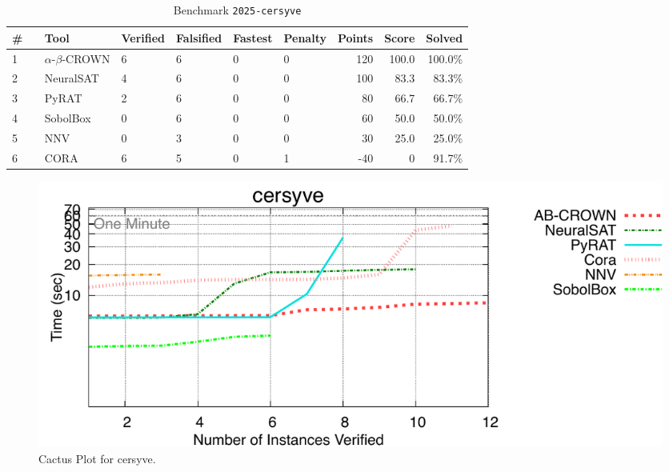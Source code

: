 \begin{table}[h]
\begin{center}
\caption{Benchmark \texttt{2025-cersyve}} \label{tab:cat_2025_cersyve}
{\setlength{\tabcolsep}{2pt}
\begin{tabular}[h]{@{}llllllrrr@{}}
\toprule
\textbf{\# ~} & \textbf{Tool} & \textbf{Verified} & \textbf{Falsified} & \textbf{Fastest} & \textbf{Penalty} & \textbf{Points} & \textbf{Score} & \textbf{Solved}\\
\midrule
1 & $\alpha$-$\beta$-CROWN & 6 & 6 & 0 & 0 & 120 & 100.0 & 100.0\% \\
2 & NeuralSAT & 4 & 6 & 0 & 0 & 100 & 83.3 & 83.3\% \\
3 & PyRAT & 2 & 6 & 0 & 0 & 80 & 66.7 & 66.7\% \\
4 & SobolBox & 0 & 6 & 0 & 0 & 60 & 50.0 & 50.0\% \\
5 & NNV & 0 & 3 & 0 & 0 & 30 & 25.0 & 25.0\% \\
6 & CORA & 6 & 5 & 0 & 1 & -40 & 0 & 91.7\% \\
\bottomrule
\end{tabular}
}
\end{center}
\end{table}



\begin{figure}[h]
\centerline{\includegraphics[width=\textwidth]{cactus/2025_cersyve.pdf}}
\caption{Cactus Plot for cersyve.}
\label{fig:quantPic}
\end{figure}


\clearpage

